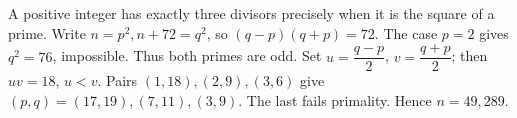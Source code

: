 A positive integer has exactly three divisors precisely when it is the square of a prime. Write $n=p^2,n+72=q^2$, so $(q-p)(q+p)=72$. The case $p=2$ gives $q^2=76$, impossible. Thus both primes are odd. Set $u=\dfrac{q-p}{2}$, $v=\dfrac{q+p}{2}$; then $uv=18$, $u<v$. Pairs $(1,18),(2,9),(3,6)$ give $(p,q)=(17,19),(7,11),(3,9)$. The last fails primality. Hence $\boxed{n=49,289}$.
